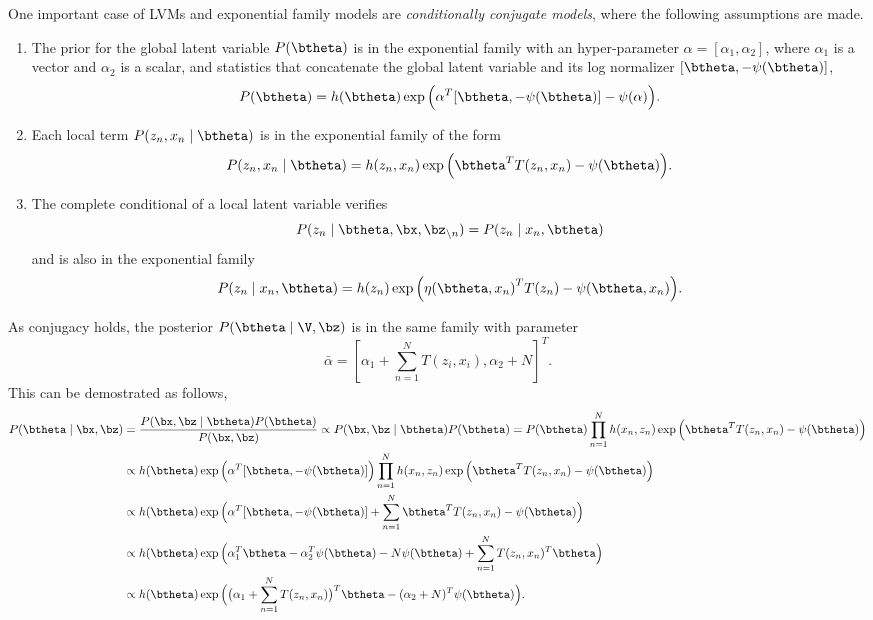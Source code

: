 One important case of LVMs and exponential family models are \emph{conditionally conjugate models}, where the following assumptions are made.
\begin{enumerate}[itemsep=2ex]
  \item The prior for the global latent variable \(P(\btheta)\) is in the exponential family with an hyper-parameter \(\alpha = [\alpha_{1}, \alpha_{2}]\), where \(\alpha_{1}\) is a vector and \(\alpha_{2}\) is a scalar, and statistics that concatenate the global latent variable and its log normalizer \([\btheta, -\psi(\btheta)]\),
    \[
    P(\btheta) = h(\btheta) \exp \Big( \alpha^{T}[\btheta, -\psi(\btheta)] - \psi(\alpha)\Big).
    \]
  \item Each local term \(P(z_{n},x_{n} \mid \btheta)\) is in the exponential family of the form
    \[
    P(z_{n},x_{n} \mid \btheta) = h(z_{n}, x_{n}) \exp \Big( \btheta^{T} T(z_{n}, x_{n}) - \psi(\btheta) \Big).
    \]
  \item The complete conditional of a local latent variable verifies
    \[
    P(z_{n} \mid \btheta, \bx, \bz_{\backslash n}) = P(z_{n} \mid x_{n}, \btheta)
    \]
    and is also in the exponential family
    \[
    P(z_{n}\mid x_{n} , \btheta) =  h(z_{n})\exp \Big( {\eta(\btheta, x_{n})}^{T}T(z_{n}) - \psi(\btheta, x_{n}) \Big).
    \]

\end{enumerate}

As conjugacy holds, the posterior \(P(\btheta \mid \V, \bz)\) is in the same family with parameter
\[
  \bar{\alpha} = [\alpha_{1} + \sum_{n=1}^{N} T(z_{i}, x_{i}), \alpha_{2}+ N]^{T}.
\]
This can be demostrated as follows,
\[
  \begin{aligned}
    P(\btheta \mid \bx, \bz) &= \frac{P(\bx, \bz \mid \btheta) P(\btheta)}{P(\bx, \bz)} \propto  P(\bx, \bz \mid \btheta) P(\btheta) = P(\btheta) \prod_{n=1}^{N}h(x_{n}, z_{n})\exp \Big( \btheta^{T}T(z_{n}, x_{n})  - \psi(\btheta) \Big)\\
    &\propto  h(\btheta) \exp \Big( \alpha^{T}[\btheta, -\psi(\btheta)]\Big)  \prod_{n=1}^{N}h(x_{n}, z_{n})\exp \Big( \btheta^{T}T(z_{n}, x_{n})  - \psi(\btheta) \Big)\\
    &\propto h(\btheta) \exp \Big(   \alpha^{T}[\btheta, -\psi(\btheta)] + \sum_{n=1}^{N}  \btheta^{T}T(z_{n}, x_{n})  - \psi(\btheta)  \Big)\\
    &\propto h(\btheta) \exp \Big(   \alpha_{1}^{T}\btheta  - \alpha_{2}^{T}\psi(\btheta) - N\psi(\btheta) + \sum_{n=1}^{N}  T(z_{n}, x_{n})^{T}\btheta  \Big)\\
    &\propto h(\btheta) \exp \Big(   \big(\alpha_{1} + \sum_{n=1}^{N}  T(z_{n}, x_{n})\big)^{T} \btheta  - (\alpha_{2} + N)^{T}\psi(\btheta) \Big).
  \end{aligned}
\]

